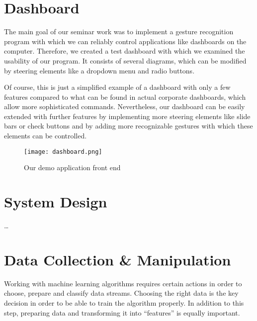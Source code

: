 \chapter{Dashboard}
\label{ch:Dashboard}

The main goal of our seminar work was to implement a gesture recognition program with which we can reliably control applications like dashboards on the computer.
Therefore, we created a test dashboard with which we examined the usability of our program.
It consists of several diagrams, which can be modified by steering elements like a dropdown menu and radio buttons.

Of course, this is just a simplified example of a dashboard with only a few features compared to what can be found in actual corporate dashboards, which allow more sophisticated commands.
Nevertheless, our dashboard can be easily extended with further features by implementing more steering elements like slide bars or check buttons and by adding more recognizable gestures with which these elements can be controlled.  

\begin{figure}[htp]
\begin{center}
  \texttt{[image: dashboard.png]}
\caption{Our demo application front end}
\end{center}
\end{figure} 


\chapter{System Design}
\label{ch:SystemDesign}

\dots


\chapter{Data Collection \& Manipulation}
\label{ch:DataCollection}

Working  with  machine  learning  algorithms  requires  certain  actions  in  order  to choose, prepare and classify data streams.
Choosing the right data is the key decision in order to be able to train the  algorithm properly.
In addition to this  step, preparing data and transforming it into “features” is equally important. 


